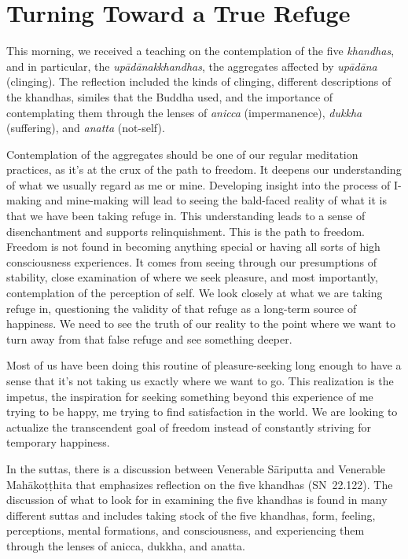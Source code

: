 
\chapter{Turning Toward a True Refuge}

This morning, we received a teaching on the contemplation of the five \emph{khandhas}, and in particular, the \emph{upādānakkhandhas}, the aggregates affected by \emph{upādāna} (clinging). The reflection included the kinds of clinging, different descriptions of the khandhas, similes that the Buddha used, and the importance of contemplating them through the lenses of \emph{anicca} (impermanence), \emph{dukkha} (suffering), and \emph{anatta} (not-self).

Contemplation of the aggregates should be one of our regular meditation practices, as it's at the crux of the path to freedom. It deepens our understanding of what we usually regard as me or mine. Developing insight into the process of I-making and mine-making will lead to seeing the bald-faced reality of what it is that we have been taking refuge in. This understanding leads to a sense of disenchantment and supports relinquishment. This is the path to freedom. Freedom is not found in becoming anything special or having all sorts of high consciousness experiences. It comes from seeing through our presumptions of stability, close examination of where we seek pleasure, and most importantly, contemplation of the perception of self. We look closely at what we are taking refuge in, questioning the validity of that refuge as a long-term source of happiness. We need to see the truth of our reality to the point where we want to turn away from that false refuge and see something deeper.

Most of us have been doing this routine of pleasure-seeking long enough to have a sense that it's not taking us exactly where we want to go. This realization is the impetus, the inspiration for seeking something beyond this experience of me trying to be happy, me trying to find satisfaction in the world. We are looking to actualize the transcendent goal of freedom instead of constantly striving for temporary happiness.

In the suttas, there is a discussion between Venerable Sāriputta and Venerable Mahākoṭṭhita that emphasizes reflection on the five khandhas \mbox{(SN 22.122)}. The discussion of what to look for in examining the five khandhas is found in many different suttas and includes taking stock of the five khandhas, form, feeling, perceptions, mental formations, and consciousness, and experiencing them through the lenses of anicca, dukkha, and anatta.

